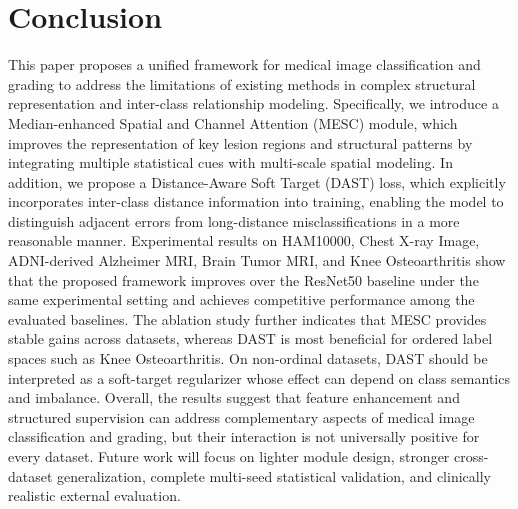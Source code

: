 \documentclass[runningheads]{llncs}
\begin{document}
   

\section{Conclusion}

This paper proposes a unified framework for medical image classification and grading to address the limitations of existing methods in complex structural representation and inter-class relationship modeling. Specifically, we introduce a Median-enhanced Spatial and Channel Attention (MESC) module, which improves the representation of key lesion regions and structural patterns by integrating multiple statistical cues with multi-scale spatial modeling. In addition, we propose a Distance-Aware Soft Target (DAST) loss, which explicitly incorporates inter-class distance information into training, enabling the model to distinguish adjacent errors from long-distance misclassifications in a more reasonable manner.
Experimental results on HAM10000, Chest X-ray Image, ADNI-derived Alzheimer MRI, Brain Tumor MRI, and Knee Osteoarthritis show that the proposed framework improves over the ResNet50 baseline under the same experimental setting and achieves competitive performance among the evaluated baselines. The ablation study further indicates that MESC provides stable gains across datasets, whereas DAST is most beneficial for ordered label spaces such as Knee Osteoarthritis. On non-ordinal datasets, DAST should be interpreted as a soft-target regularizer whose effect can depend on class semantics and imbalance.
Overall, the results suggest that feature enhancement and structured supervision can address complementary aspects of medical image classification and grading, but their interaction is not universally positive for every dataset. Future work will focus on lighter module design, stronger cross-dataset generalization, complete multi-seed statistical validation, and clinically realistic external evaluation.
\end{document}
